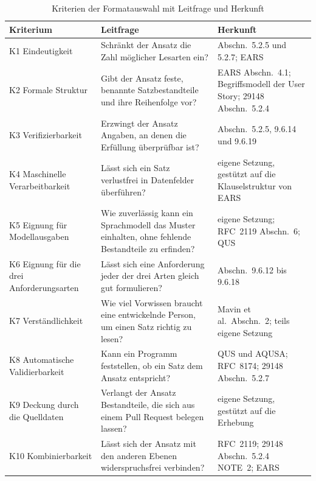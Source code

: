 \documentclass[11pt,a4paper]{report}
\begin{document}
\begin{table}[htbp]
  \centering
  \caption{Kriterien der Formatauswahl mit Leitfrage und Herkunft}
  \label{tab:kriterienkatalog}
  \begin{tabular}{@{}>{\raggedright\arraybackslash}p{2.6cm}%
                    >{\raggedright\arraybackslash}p{5.6cm}%
                    >{\raggedright\arraybackslash}p{4.0cm}@{}}
    \toprule
    \textbf{Kriterium} & \textbf{Leitfrage} & \textbf{Herkunft} \\
    \midrule
    K1 Eindeutigkeit &
    Schränkt der Ansatz die Zahl möglicher Lesarten ein? &
    29148 Abschn.~5.2.5 und 5.2.7; EARS \\
    K2 Formale Struktur &
    Gibt der Ansatz feste, benannte Satzbestandteile und ihre
    Reihenfolge vor? &
    EARS Abschn.~4.1; Begriffsmodell der User Story; 29148
    Abschn.~5.2.4 \\
    K3 Verifizierbarkeit &
    Erzwingt der Ansatz Angaben, an denen die Erfüllung überprüfbar
    ist? &
    29148 Abschn.~5.2.5, 9.6.14 und 9.6.19 \\
    K4 Maschinelle Verarbeitbarkeit &
    Lässt sich ein Satz verlustfrei in Datenfelder überführen? &
    eigene Setzung, gestützt auf die Klauselstruktur von EARS \\
    K5 Eignung für Modellausgaben &
    Wie zuverlässig kann ein Sprachmodell das Muster einhalten, ohne
    fehlende Bestandteile zu erfinden? &
    eigene Setzung; RFC~2119 Abschn.~6; QUS \\
    K6 Eignung für die drei Anforderungsarten &
    Lässt sich eine Anforderung jeder der drei Arten gleich gut
    formulieren? &
    29148 Abschn.~9.6.12 bis 9.6.18 \\
    K7 Verständlichkeit &
    Wie viel Vorwissen braucht eine entwickelnde Person, um einen Satz
    richtig zu lesen? &
    Mavin et al.\ Abschn.~2; teils eigene Setzung \\
    K8 Automatische Validierbarkeit &
    Kann ein Programm feststellen, ob ein Satz dem Ansatz entspricht? &
    QUS und AQUSA; RFC~8174; 29148 Abschn.~5.2.7 \\
    K9 Deckung durch die Quelldaten &
    Verlangt der Ansatz Bestandteile, die sich aus einem Pull Request
    belegen lassen? &
    eigene Setzung, gestützt auf die Erhebung \\
    K10 Kombinierbarkeit &
    Lässt sich der Ansatz mit den anderen Ebenen widerspruchsfrei
    verbinden? &
    RFC~2119; 29148 Abschn.~5.2.4 NOTE~2; EARS \\
    \bottomrule
  \end{tabular}
\end{table}
\end{document}
